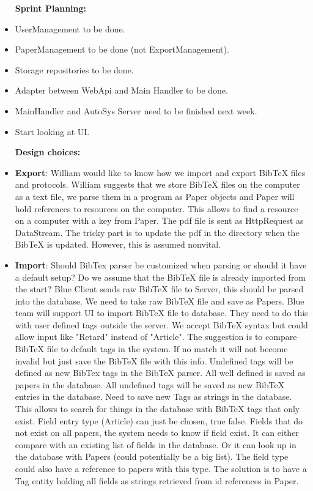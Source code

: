 \begin{itemize}
	\item [\textbf{Sprint Planning:}]
	\item UserManagement to be done. 
	\item PaperManagement to be done (not ExportManagement). 
	\item Storage repositories to be done. 
	\item Adapter between WebApi and Main Handler to be done. 
	\item MainHandler and AutoSys Server need to be finished next week. 
	\item Start looking at UI. 
\end{itemize}

\begin{itemize}
	\item [\textbf{Design choices:}]
	\item \textbf{Export}: William would like to know how we import and export BibTeX files and protocols. William suggests that we store BibTeX files on the computer as a text file, we parse them in a program as Paper objects and Paper will hold references to resources on the computer. This allows to find a resource on a computer with a key from Paper. The pdf file is sent as HttpRequest as DataStream. The tricky part is to update the pdf in the directory when the BibTeX is updated. However, this is assumed nonvital.
	\item \textbf{Import}: Should BibTex parser be customized when parsing or should it have a default setup? Do we assume that the BibTeX file is already imported from the start? Blue Client sends raw BibTeX file to Server, this should be parsed into the database. We need to take raw BibTeX file and save as Papers. Blue team will support UI to import BibTeX file to database. They need to do this with user defined tags outside the server. We accept BibTeX syntax but could allow input like "Retard" instead of "Article". The suggestion is to compare BibTeX file to default tags in the system. If no match it will not become invalid but just save the BibTeX file with this info. Undefined tags will be defined as new BibTex tags in the BibTeX parser. All well defined is saved as papers in the database. All undefined tags will be saved as new BibTeX entries in the database. Need to save new Tags as strings in the database. This allows to search for things in the database with BibTeX tags that only exist. Field entry type (Article) can just be chosen, true false. Fields that do not exist on all papers, the system needs to know if field exist. It can either compare with an existing list of fields in the database. Or it can look up in the database with Papers (could potentially be a big list). The field type could also have a reference to papers with this type. The solution is to have a Tag entity holding all fields as strings retrieved from id references in Paper. 

\end{itemize}
